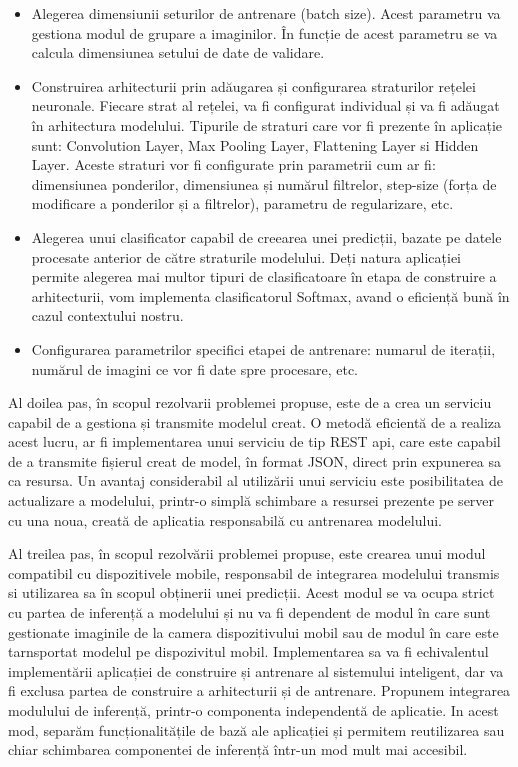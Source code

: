	\begin{itemize}
	\item	Alegerea dimensiunii seturilor de antrenare (batch size). Acest parametru va gestiona modul de grupare a imaginilor. În funcție de acest parametru se va calcula dimensiunea setului de date de validare.
	
	
	\item	Construirea arhitecturii prin adăugarea și configurarea straturilor rețelei neuronale.  Fiecare strat al rețelei, va fi configurat individual și va fi adăugat în arhitectura modelului. Tipurile de straturi care vor fi prezente în aplicație sunt: Convolution Layer, Max Pooling Layer, Flattening Layer si Hidden Layer. Aceste straturi vor fi configurate prin parametrii cum ar fi: dimensiunea ponderilor, dimensiunea și numărul filtrelor, step-size (forța de modificare a ponderilor și a filtrelor), parametru de regularizare, etc.
	
	\item	Alegerea unui clasificator capabil de creearea unei predicții, bazate pe datele procesate anterior de către straturile modelului. Deți  natura aplicației permite alegerea mai multor tipuri de clasificatoare în etapa de construire a arhitecturii, vom implementa clasificatorul Softmax, avand o eficiență bună în cazul contextului nostru.
	
	\item	Configurarea parametrilor specifici etapei de antrenare: numarul de iterații, numărul de imagini ce vor fi date spre procesare, etc.
	
	\end{itemize}

	Al doilea pas, în scopul rezolvarii problemei propuse, este de a crea un serviciu capabil de a gestiona și transmite modelul creat. O metodă eficientă de a realiza acest lucru, ar fi implementarea unui serviciu de tip REST api, care este capabil de a transmite fișierul creat de model, în format JSON, direct prin expunerea sa ca resursa. 
	Un avantaj considerabil al utilizării unui serviciu este posibilitatea de actualizare a modelului, printr-o simplă schimbare a resursei prezente pe server cu una noua, creată de aplicatia responsabilă cu antrenarea modelului. 
	
	Al treilea pas, în scopul rezolvării problemei propuse, este crearea unui modul compatibil cu dispozitivele mobile, responsabil de integrarea modelului transmis si utilizarea sa în scopul obținerii unei predicții. 
	Acest modul se va ocupa strict cu partea de inferență a modelului și nu va fi dependent de modul în care sunt gestionate imaginile de la camera dispozitivului mobil sau de modul în care este tarnsportat modelul pe dispozivitul mobil. Implementarea sa va fi echivalentul implementării aplicației de construire și antrenare al sistemului inteligent, dar va fi exclusa partea de construire a arhitecturii și de antrenare. 
	Propunem integrarea modulului de inferență, printr-o componenta independentă de aplicatie. In acest mod, separăm funcționalitățile de bază ale aplicației și permitem reutilizarea sau chiar schimbarea componentei de inferență într-un mod mult mai accesibil.
	
